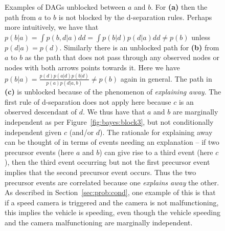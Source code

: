 \begin{figure}[p]
	\centering 
	\hspace{-15pt}
	\begin{subfigure}[t]{0.32\textwidth}
		\centering
		\resizebox{0.9\textwidth}{!}{
		}
		\caption{\label{fig:bayes:unblock1}}
	\end{subfigure}
	\begin{subfigure}[t]{0.32\textwidth}
		\centering
		\resizebox{0.9\textwidth}{!}{
		}
		\caption{\label{fig:bayes:unblock2}}
	\end{subfigure}
	\begin{subfigure}[t]{0.32\textwidth}
		\centering
		\resizebox{1.1\textwidth}{!}{
		}
		\caption{\label{fig:bayes:unblock3}}
	\end{subfigure}
	\caption{Examples of DAGs unblocked between $a$ and $b$. For \textbf{(a)} then the path from $a$ to
		$b$ is not blocked by the d-separation rules.  Perhaps more intuitively, we have that
		$p(b|a) = \int p(b,d|a) dd = \int p(b|d)p(d|a) dd \neq p(b)$ unless $p(d|a)=p(d)$.
		Similarly there is an unblocked path for \textbf{(b)} from $a$ to $b$ as the path
		that does not pass through any observed nodes or nodes with both arrows points towards it.
		Here we have $p(b|a) = \frac{p(d)p(a|d)p(b|d)}{p(a)p(d|a,b)} \neq p(b)$ again in general.
		The path in \textbf{(c)} is unblocked because of the phenomenon of \emph{explaining away}.
		The first rule of d-separation does not apply here because $c$ is an observed descendant of
		$d$.  We thus have that $a$ and $b$ are marginally independent as per Figure~\ref{fig:bayes:block3},
		but not conditionally independent given $c$ (and/or $d$). The rationale for explaining away can be thought
		of in terms of events needing an explanation -- if two precursor events (here $a$ and $b$) can give rise 
		to a third event (here $c$), then
		the third event occurring but not the first precursor event implies that the second precursor
		event occurs.  Thus the two precursor events are correlated because one \emph{explains away} the other.
		As described in Section~\ref{sec:prob:cond}, one example of this is that if a speed camera is
		triggered and the camera is not malfunctioning, this implies the vehicle is speeding, even though
		the vehicle speeding and the camera malfunctioning are marginally independent.	
		\label{fig:bayes:unblocked-graphs}}
\end{figure}

